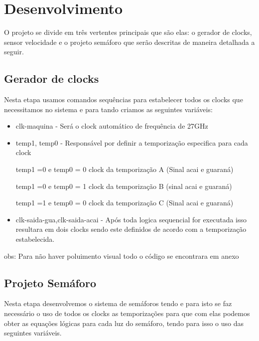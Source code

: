 
\section{Desenvolvimento}
\setlength{\parindent}{2cm}

O projeto se divide em três vertentes principais que são elas: o gerador de clocks, sensor velocidade e o projeto semáforo que serão descritas de maneira detalhada a seguir.

\subsection{Gerador de clocks}
\setlength{\parindent}{2cm}

Nesta etapa usamos comandos sequências para estabelecer todos os clocks que necessitamos no sistema e para tando criamos as seguintes variáveis:

\begin{itemize}
\item clk-maquina - Será o clock automático de frequência de 27GHz 

\item temp1, temp0  - Responsável por definir a temporização especifica para cada clock

temp1 =0 e temp0 = 0 clock da temporização A (Sinal acai e guaraná)

temp1 =0 e temp0 = 1 clock da temporização B (sinal acai e guaraná) 

temp1 =1 e temp0 = 0 clock da temporização C (Sinal acai e guaraná)

\item clk-saida-gua,clk-saida-acai - Após toda logica sequencial for executada isso resultara em dois clocks sendo este definidos de acordo com a temporização estabelecida.

\end{itemize}

\setlength{\parindent}{2cm}

obs: Para não haver poluimento visual todo o código se encontrara em anexo

\subsection{Projeto Semáforo}

\setlength{\parindent}{2cm}

Nesta etapa desenvolvemos o sistema de semáforos tendo e para isto se faz necessário o uso de todos os clocks as temporizações para que com elas podemos obter as equações lógicas para cada luz do semáforo, tendo para isso o uso das seguintes variáveis.

